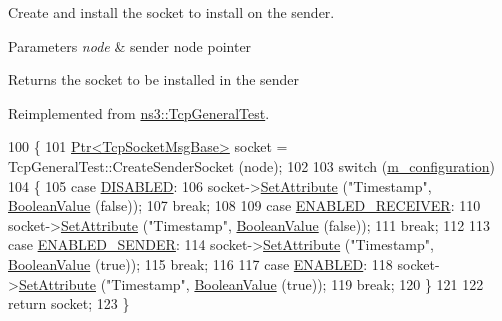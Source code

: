Create and install the socket to install on the sender. 


\begin{DoxyParams}{Parameters}
{\em node} & sender node pointer \\
\hline
\end{DoxyParams}
\begin{DoxyReturn}{Returns}
the socket to be installed in the sender 
\end{DoxyReturn}


Reimplemented from \hyperlink{classns3_1_1TcpGeneralTest_a0476c37d8a08b42d42f6ea2634eece70}{ns3\+::\+Tcp\+General\+Test}.


\begin{DoxyCode}
100 \{
101   \hyperlink{classns3_1_1Ptr}{Ptr<TcpSocketMsgBase>} socket = TcpGeneralTest::CreateSenderSocket (node);
102 
103   \textcolor{keywordflow}{switch} (\hyperlink{classTimestampTestCase_a23ae1fc181bfd5b913f6b8219349e23c}{m\_configuration})
104     \{
105     \textcolor{keywordflow}{case} \hyperlink{classTimestampTestCase_a98399735307f2da16757d48f88ebbd6aa7478101986b562387eea24a910632880}{DISABLED}:
106       socket->\hyperlink{classns3_1_1ObjectBase_ac60245d3ea4123bbc9b1d391f1f6592f}{SetAttribute} (\textcolor{stringliteral}{"Timestamp"}, \hyperlink{classns3_1_1BooleanValue}{BooleanValue} (\textcolor{keyword}{false}));
107       \textcolor{keywordflow}{break};
108 
109     \textcolor{keywordflow}{case} \hyperlink{classTimestampTestCase_a98399735307f2da16757d48f88ebbd6aab1676abdfe892d1578256cdc2095cb8a}{ENABLED\_RECEIVER}:
110       socket->\hyperlink{classns3_1_1ObjectBase_ac60245d3ea4123bbc9b1d391f1f6592f}{SetAttribute} (\textcolor{stringliteral}{"Timestamp"}, \hyperlink{classns3_1_1BooleanValue}{BooleanValue} (\textcolor{keyword}{false}));
111       \textcolor{keywordflow}{break};
112 
113     \textcolor{keywordflow}{case} \hyperlink{classTimestampTestCase_a98399735307f2da16757d48f88ebbd6aaea98c375a5153b8db5af79c408d95e50}{ENABLED\_SENDER}:
114       socket->\hyperlink{classns3_1_1ObjectBase_ac60245d3ea4123bbc9b1d391f1f6592f}{SetAttribute} (\textcolor{stringliteral}{"Timestamp"}, \hyperlink{classns3_1_1BooleanValue}{BooleanValue} (\textcolor{keyword}{true}));
115       \textcolor{keywordflow}{break};
116 
117     \textcolor{keywordflow}{case} \hyperlink{classTimestampTestCase_a98399735307f2da16757d48f88ebbd6aad00a02cea964b70034eb6324f29bb891}{ENABLED}:
118       socket->\hyperlink{classns3_1_1ObjectBase_ac60245d3ea4123bbc9b1d391f1f6592f}{SetAttribute} (\textcolor{stringliteral}{"Timestamp"}, \hyperlink{classns3_1_1BooleanValue}{BooleanValue} (\textcolor{keyword}{true}));
119       \textcolor{keywordflow}{break};
120     \}
121 
122   \textcolor{keywordflow}{return} socket;
123 \}
\end{DoxyCode}


